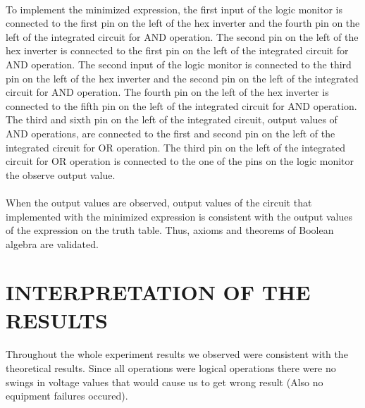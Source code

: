 \documentclass[pdftex,12pt,a4paper]{article}
\begin{document}
\begin{flushleft}
\paragraph{}
To implement the minimized expression, the first input of the logic monitor is connected to the first pin on the left of the hex inverter and the fourth pin on the left of the integrated circuit for AND operation. The second pin on the left of the hex inverter is connected to the first pin on the left of the integrated circuit for AND operation. The second input of the logic monitor is connected to the third pin on the left of the hex inverter and the second pin on the left of the integrated circuit for AND operation. The fourth pin on the left of the hex inverter is connected to the fifth pin on the left of the integrated circuit for AND operation. The third and sixth pin on the left of the integrated circuit, output values of AND operations, are connected to the first and second pin on the left of the integrated circuit for OR operation. The third pin on the left of the integrated circuit for OR operation is connected to the one of the pins on the logic monitor the observe output value.


\paragraph{}
When the output values are observed, output values of the circuit that implemented with the minimized expression is consistent with the output values of the expression on the truth table. Thus, axioms and theorems of Boolean algebra are validated.

\end{flushleft}
\section{INTERPRETATION OF THE RESULTS}
\begin{flushleft}
\paragraph{}
Throughout the whole experiment results we observed were consistent with the theoretical results. Since all operations
 were logical operations there were no swings in voltage values that would cause us to get wrong result (Also no equipment failures occured).
\end{flushleft}
\end{document}
